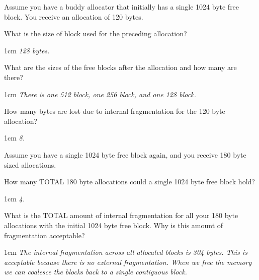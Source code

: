 \documentclass[12pt]{article}
\newenvironment{answer}{\begin{adjustwidth}{1cm}{}\itshape}{\end{adjustwidth}}
\begin{document}
Assume you have a buddy allocator that initially has a single
1024 byte free block. You receive an allocation of 120 bytes.

\vspace{1em}

What is the size of block used for the preceding allocation?

\begin{answer}
  128 bytes.
\end{answer}

\vspace{1em}

What are the sizes of the free blocks after the allocation and
how many are there?

\begin{answer}
  There is one 512 block, one 256 block, and one 128 block.
\end{answer}

\vspace{1em}

How many bytes are lost due to internal fragmentation for the
120 byte allocation?

\begin{answer}
  8.
\end{answer}

\vspace{1em}

Assume you have a single 1024 byte free block again, and you receive 180 byte
sized allocations.

\vspace{1em}

How many TOTAL 180 byte allocations could a single 1024 byte
free block hold?

\begin{answer}
  4.
\end{answer}

\vspace{1em}

What is the TOTAL amount of internal fragmentation for all
your 180 byte allocations with the initial 1024 byte free block.
Why is this amount of fragmentation acceptable?

\begin{answer}
  The internal fragmentation across all allocated blocks is 304 bytes.
  This is acceptable because there is no external fragmentation. When
  we free the memory we can coalesce the blocks back to a single contiguous
  block.
\end{answer}
\end{document}
